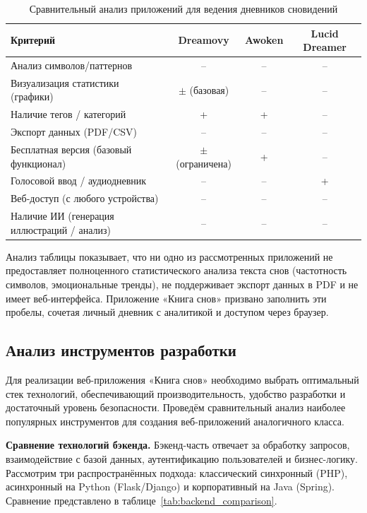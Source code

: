 \documentclass[14pt, a4paper]{extarticle}
\begin{document}
\begin{table}[ht!]
	\centering
	\caption{Сравнительный анализ приложений для ведения дневников сновидений}
	\label{tab:competitors_analysis}
	\footnotesize
	\begin{tabular}{|p{8.5cm}|c|c|c|}
		\hline
		\textbf{Критерий} &
		\textbf{Dreamovy} &
		\textbf{Awoken} &
		\textbf{Lucid Dreamer} \\
		\hline
		Анализ символов/паттернов         & – & – & –  \\
		\hline
		Визуализация статистики (графики)  & \(\pm\) (базовая) & – & – \\
		\hline
		Наличие тегов / категорий          & + & + & – \\
		\hline
		Экспорт данных (PDF/CSV)           & – & – & – \\
		\hline
		Бесплатная версия (базовый функционал) & \(\pm\) (ограничена) & + & – \\
		\hline
		Голосовой ввод / аудиодневник      & – & – & + \\
		\hline
		Веб-доступ (с любого устройства)   & – & – & – \\
		\hline
        Наличие ИИ (генерация иллюстраций / анализ) & – & – & – \\
		\hline
	\end{tabular}
\end{table}

Анализ таблицы показывает, что ни одно из рассмотренных приложений не
предоставляет полноценного статистического анализа текста снов
(частотность символов, эмоциональные тренды), не поддерживает экспорт
данных в PDF и не имеет веб-интерфейса. Приложение «Книга снов» призвано
заполнить эти пробелы, сочетая личный дневник с аналитикой и доступом
через браузер.

\subsection{Анализ инструментов разработки}

Для реализации веб-приложения «Книга снов» необходимо выбрать
оптимальный стек технологий, обеспечивающий производительность,
удобство разработки и достаточный уровень безопасности. Проведём
сравнительный анализ наиболее популярных инструментов для создания
веб-приложений аналогичного класса.

\textbf{Сравнение технологий бэкенда.} Бэкенд-часть отвечает за обработку запросов, взаимодействие с базой
данных, аутентификацию пользователей и бизнес-логику. Рассмотрим три
распространённых подхода: классический синхронный (PHP), асинхронный
на Python (Flask/Django) и корпоративный на Java (Spring). Сравнение
представлено в таблице~\ref{tab:backend_comparison}.
\end{document}
